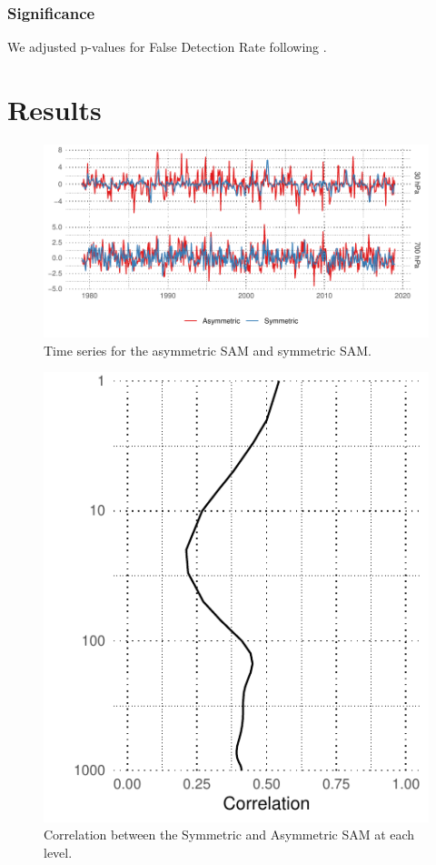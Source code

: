 \documentclass[]{ametsocV5}
\begin{document}
\subsubsection{Significance}

We adjusted p-values for False Detection Rate following
\citet{wilks2016}.

\section{Results}

\begin{figure}
\includegraphics{asymsam-timeseries-1} \caption[Time series for the asymmetric SAM and symmetric SAM]{Time series for the asymmetric SAM and symmetric SAM.}\label{fig:asymsam-timeseries}
\end{figure}

\begin{figure}
\includegraphics{cor-lev-1} \caption[Correlation between the Symmetric and Asymmetric SAM at each level]{Correlation between the Symmetric and Asymmetric SAM at each level.}\label{fig:cor-lev}
\end{figure}
\end{document}
